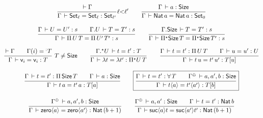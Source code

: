 \begin{figure}[htbp]
\begin{gather*}
  \ru{\der \Gamma
    }{\Gamma \der \Set[\ell] = \Set[\ell]: \Set[\ell']
    }{\ell {<} \ell'}
\qquad
  \ru{%
      \Gamma \der a : \Size
    }{\Gamma \der \Nat a = \Nat a : \Set[0]}
\\[2ex]
  \ru{\Gamma \der U = U' : s \qquad
      \cext \Gamma U \der T = T' : s
    }{\Gamma \der \piT U T = \piT{U'}{T'}: s}
\qquad
  \ru{\cext \Gamma \Size \der T = T' : s
    }{\Gamma \der \epiT \Size T = \epiT \Size T' : s}
\\[2ex]
  \rux{\der \Gamma \qquad \Gamma(i) = \erann[\noterased] T
    }{\Gamma \der \ind i = \ind i : T
    }{T \not= \Size}
\qquad
  \ru{\eext \Gamma U \der t = t' : T
    }{\Gamma \der \lambda t = \lambda t' : \epiT U T}
\qquad
  \ru{\Gamma \der t = t' : \piT U T \qquad
      \Gamma \der u = u' : U
    }{\Gamma \der t\,u = t'\,u' : T[u]}
\\[2ex]
  \ru{\Gamma \der t = t' : \piT \Size T \qquad
      \Gamma \der a : \Size
    }{\Gamma \der t\,a = t'\,a : T[a]}
\qquad
\fbox{$
  \ru{\Gamma \der t = t' : \forallT T \qquad
      \resurrect\Gamma \der a,a',b : \Size
    }{\Gamma \der t \ann a = t' \ann{a'} : T[b]}
  $}
\\[2ex] %
  \ru{%
      \resurrect\Gamma \der a, a', b : \Size
    }{\Gamma \der \zero a = \zero {a'}: \Nat (b + 1)}
\qquad
  \ru{\resurrect \Gamma \der a, a' : \Size \qquad
      \Gamma \der t = t' : \Nat b
    }{\Gamma \der \suc a t = \suc {a'} t' : \Nat (b + 1)}
\\[2ex]

\end{gather*}
\end{figure}
